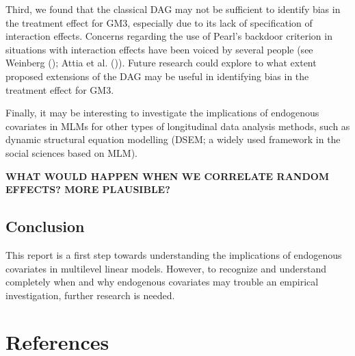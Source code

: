 \documentclass[
  11pt,
  a4paper,
]{article}
\begin{document}
Third, we found that the classical DAG may not be sufficient to identify
bias in the treatment effect for GM3, especially due to its lack of
specification of interaction effects. Concerns regarding the use of
Pearl's backdoor criterion in situations with interaction effects have
been voiced by several people (see Weinberg
(); Attia et al.
()). Future research could explore to what
extent proposed extensions of the DAG may be useful in identifying bias
in the treatment effect for GM3.

Finally, it may be interesting to investigate the implications of
endogenous covariates in MLMs for other types of longitudinal data
analysis methods, such as dynamic structural equation modelling (DSEM; a
widely used framework in the social sciences based on MLM).

\textbf{WHAT WOULD HAPPEN WHEN WE CORRELATE RANDOM EFFECTS? MORE
PLAUSIBLE?}

\subsection{Conclusion}\label{conclusion}

This report is a first step towards understanding the implications of
endogenous covariates in multilevel linear models. However, to recognize
and understand completely when and why endogenous covariates may trouble
an empirical investigation, further research is needed.

\newpage

\section{References}\label{references}
\end{document}
